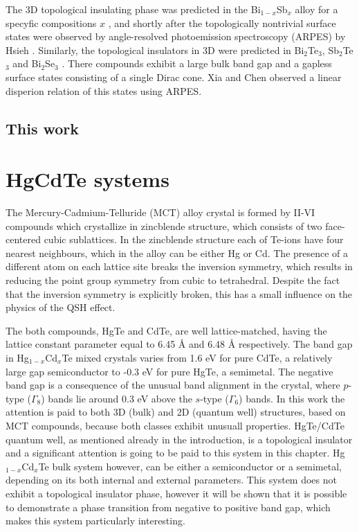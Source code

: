 \documentclass[titlepage,a4paper]{book}
\newcommand{\wciecie}{\quad\phantom{v}}
\begin{document}
The 3D topological insulating phase was predicted in the Bi$_{1-x}$Sb$_x$ alloy for a specyfic compositions $x$ \cite{Fu_Topology}, and shortly after the topologically nontrivial surface states were observed by angle-resolved photoemission spectroscopy (ARPES) by Hsieh \cite{Hsieh}. Similarly, the topological insulators in 3D were predicted in Bi$_2$Te$_3$, Sb$_2$Te$_3$ \cite{Zhang_Topology} and Bi$_2$Se$_3$ \cite{Zhang_Topology}\cite{Xia_Topology}. There compounds exhibit a large bulk band gap and a gapless surface states consisting of a single Dirac cone. Xia \cite{Xia_Topology} and Chen \cite{Chen_Topology} observed a linear disperion relation of this states using ARPES.


\section{This work}

\chapter{HgCdTe systems}
\wciecie
The Mercury-Cadmium-Telluride (MCT) alloy crystal is formed by II-VI compounds which crystallize in zincblende structure, which consists of two face-centered cubic sublattices. In the zincblende structure each of Te-ions have four nearest neighbours, which in the alloy can be either Hg or Cd. The presence of a different atom on each lattice site breaks the inversion symmetry, which results in reducing the point group symmetry from cubic to tetrahedral. Despite the fact that the inversion symmetry is explicitly broken, this has a small influence on the physics of the QSH effect.

The both compounds, HgTe and CdTe, are well lattice-matched, having the lattice constant parameter equal to 6.45 Å and 6.48 Å respectively. The band gap in Hg$_{1-x}$Cd$_x$Te mixed crystals varies from 1.6 eV for pure CdTe, a relatively large gap semiconductor to -0.3 eV for pure HgTe, a semimetal. The negative band gap is a consequence of the unusual band alignment in the crystal, where $p$-type ($\Gamma_8$) bands lie around 0.3 eV above the $s$-type ($\Gamma_6$) bands. In this work the attention is paid to both 3D (bulk) and 2D (quantum well) structures, based on MCT compounds, because both classes exhibit unusuall properties. HgTe/CdTe quantum well, as mentioned already in the introduction, is a topological insulator and a significant attention is going to be paid to this system in this chapter.  Hg$_{1-x}$Cd$_x$Te bulk system however, can be either a semiconductor or a semimetal, depending on its both internal and external parameters. This system does not exhibit a topological insulator phase, however it will be shown that it is possible to demonstrate a phase transition from negative to positive band gap, which makes this system particularly interesting.
\end{document}
